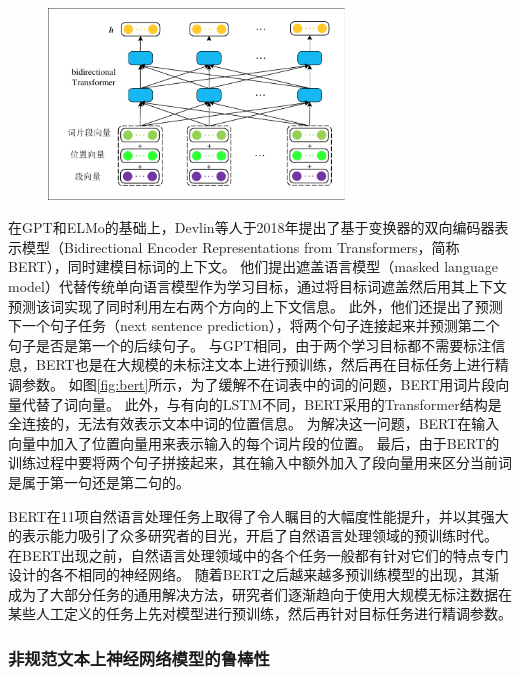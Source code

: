 \begin{figure}[htbp]
    \centering
    \includegraphics[width=0.7\textwidth]{figures/bert.pdf}
\end{figure}

在GPT和ELMo的基础上，Devlin等人于2018年提出了基于变换器的双向编码器表示模型（Bidirectional Encoder Representations from Transformers，简称BERT）\cite{devlin-etal-2018-bert}，同时建模目标词的上下文。
他们提出遮盖语言模型（masked language model）代替传统单向语言模型作为学习目标，通过将目标词遮盖然后用其上下文预测该词实现了同时利用左右两个方向的上下文信息。
此外，他们还提出了预测下一个句子任务（next sentence prediction），将两个句子连接起来并预测第二个句子是否是第一个的后续句子。
与GPT相同，由于两个学习目标都不需要标注信息，BERT也是在大规模的未标注文本上进行预训练，然后再在目标任务上进行精调参数。
如图\ref{fig:bert}所示，为了缓解不在词表中的词的问题，BERT用词片段向量代替了词向量。
此外，与有向的LSTM不同，BERT采用的Transformer结构是全连接的，无法有效表示文本中词的位置信息。
为解决这一问题，BERT在输入向量中加入了位置向量用来表示输入的每个词片段的位置。
最后，由于BERT的训练过程中要将两个句子拼接起来，其在输入中额外加入了段向量用来区分当前词是属于第一句还是第二句的。

BERT在11项自然语言处理任务上取得了令人瞩目的大幅度性能提升，并以其强大的表示能力吸引了众多研究者的目光，开启了自然语言处理领域的预训练时代。
在BERT出现之前，自然语言处理领域中的各个任务一般都有针对它们的特点专门设计的各不相同的神经网络。
随着BERT之后越来越多预训练模型的出现，其渐成为了大部分任务的通用解决方法，研究者们逐渐趋向于使用大规模无标注数据在某些人工定义的任务上先对模型进行预训练，然后再针对目标任务进行精调参数。

\subsubsection{非规范文本上神经网络模型的鲁棒性}
\label{sec:chapter1-informal-text-attack}


